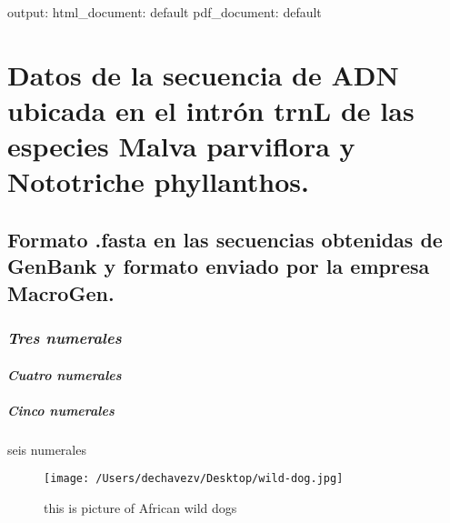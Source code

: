 \documentclass[
]{article}
\author{}
\date{\vspace{-2.5em}}
\begin{document}
output: html\_document: default pdf\_document: default

\hypertarget{datos-de-la-secuencia-de-adn-ubicada-en-el-intruxf3n-trnl-de-las-especies-malva-parviflora-y-nototriche-phyllanthos.}{%
\section{Datos de la secuencia de ADN ubicada en el intrón trnL de las
especies Malva parviflora y Nototriche
phyllanthos.}\label{datos-de-la-secuencia-de-adn-ubicada-en-el-intruxf3n-trnl-de-las-especies-malva-parviflora-y-nototriche-phyllanthos.}}

\hypertarget{formato-.fasta-en-las-secuencias-obtenidas-de-genbank-y-formato-enviado-por-la-empresa-macrogen.}{%
\subsection{\texorpdfstring{\textbf{Formato .fasta en las secuencias
obtenidas de GenBank y formato enviado por la empresa
MacroGen.}}{Formato .fasta en las secuencias obtenidas de GenBank y formato enviado por la empresa MacroGen.}}\label{formato-.fasta-en-las-secuencias-obtenidas-de-genbank-y-formato-enviado-por-la-empresa-macrogen.}}

\hypertarget{tres-numerales}{%
\subsubsection{\texorpdfstring{\emph{Tres
numerales}}{Tres numerales}}\label{tres-numerales}}

\hypertarget{cuatro-numerales}{%
\paragraph{\texorpdfstring{\textbf{\emph{Cuatro
numerales}}}{Cuatro numerales}}\label{cuatro-numerales}}

\hypertarget{cinco-numerales}{%
\subparagraph{\texorpdfstring{Cinco
\textbf{numerales}}{Cinco numerales}}\label{cinco-numerales}}

seis numerales

\begin{figure}
\centering
\texttt{[image: /Users/dechavezv/Desktop/wild-dog.jpg]}
\caption{this is picture of African wild dogs}
\end{figure}
\end{document}
